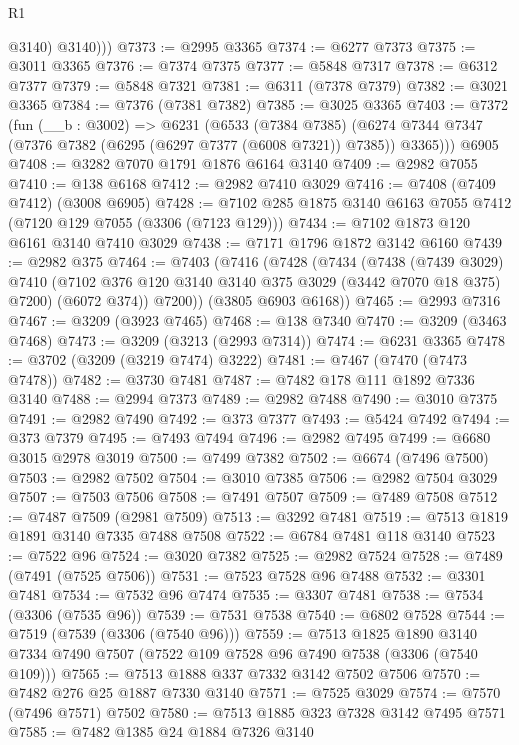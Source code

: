 \begin{lexlean}{R1}
\begin{coremodule}
            @3140)
          @3140)))
@7373 := @2995 @3365
@7374 := @6277 @7373
@7375 := @3011 @3365
@7376 := @7374 @7375
@7377 := @5848 @7317
@7378 := @6312 @7377
@7379 := @5848 @7321
@7381 := @6311 (@7378 @7379)
@7382 := @3021 @3365
@7384 := @7376 (@7381 @7382)
@7385 := @3025 @3365
@7403 := @7372
    (fun (__b : @3002) =>
    @6231
      (@6533
        (@7384 @7385)
        (@6274 @7344 @7347 (@7376 @7382 (@6295 (@6297 @7377 (@6008 @7321)) @7385)) @3365)))
    @6905
@7408 := @3282 @7070 @1791 @1876 @6164 @3140
@7409 := @2982 @7055
@7410 := @138 @6168
@7412 := @2982 @7410 @3029
@7416 := @7408 (@7409 @7412) (@3008 @6905)
@7428 := @7102 @285 @1875 @3140 @6163 @7055 @7412 (@7120 @129 @7055 (@3306 (@7123 @129)))
@7434 := @7102 @1873 @120 @6161 @3140 @7410 @3029
@7438 := @7171 @1796 @1872 @3142 @6160
@7439 := @2982 @375
@7464 := @7403
    (@7416
      (@7428
        (@7434
          (@7438
            (@7439 @3029)
            @7410
            (@7102 @376 @120 @3140 @3140 @375 @3029 (@3442 @7070 @18 @375) @7200)
            (@6072 @374))
          @7200))
      (@3805 @6903 @6168))
@7465 := @2993 @7316
@7467 := @3209 (@3923 @7465)
@7468 := @138 @7340
@7470 := @3209 (@3463 @7468)
@7473 := @3209 (@3213 (@2993 @7314))
@7474 := @6231 @3365
@7478 := @3702 (@3209 (@3219 @7474) @3222)
@7481 := @7467 (@7470 (@7473 @7478))
@7482 := @3730 @7481
@7487 := @7482 @178 @111 @1892 @7336 @3140
@7488 := @2994 @7373
@7489 := @2982 @7488
@7490 := @3010 @7375
@7491 := @2982 @7490
@7492 := @373 @7377
@7493 := @5424 @7492
@7494 := @373 @7379
@7495 := @7493 @7494
@7496 := @2982 @7495
@7499 := @6680 @3015 @2978 @3019
@7500 := @7499 @7382
@7502 := @6674 (@7496 @7500)
@7503 := @2982 @7502
@7504 := @3010 @7385
@7506 := @2982 @7504 @3029
@7507 := @7503 @7506
@7508 := @7491 @7507
@7509 := @7489 @7508
@7512 := @7487 @7509 (@2981 @7509)
@7513 := @3292 @7481
@7519 := @7513 @1819 @1891 @3140 @7335 @7488 @7508
@7522 := @6784 @7481 @118 @3140
@7523 := @7522 @96
@7524 := @3020 @7382
@7525 := @2982 @7524
@7528 := @7489 (@7491 (@7525 @7506))
@7531 := @7523 @7528 @96 @7488
@7532 := @3301 @7481
@7534 := @7532 @96 @7474
@7535 := @3307 @7481
@7538 := @7534 (@3306 (@7535 @96))
@7539 := @7531 @7538
@7540 := @6802 @7528
@7544 := @7519 (@7539 (@3306 (@7540 @96)))
@7559 := @7513
    @1825
    @1890
    @3140
    @7334
    @7490
    @7507
    (@7522 @109 @7528 @96 @7490 @7538 (@3306 (@7540 @109)))
@7565 := @7513 @1888 @337 @7332 @3142 @7502 @7506
@7570 := @7482 @276 @25 @1887 @7330 @3140
@7571 := @7525 @3029
@7574 := @7570 (@7496 @7571) @7502
@7580 := @7513 @1885 @323 @7328 @3142 @7495 @7571
@7585 := @7482 @1385 @24 @1884 @7326 @3140

\end{coremodule}
\end{lexlean}
